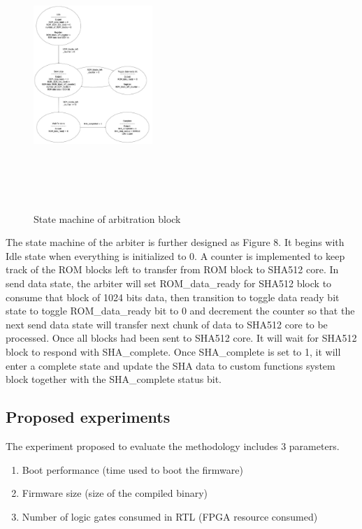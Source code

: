 \documentclass[a4paper,fleqn]{cas-dc}
\begin{document}
\begin{figure}[hbt!]
	\centering
	\includegraphics[width=0.4\textwidth,height=4in]{figs/StateMachine.JPG}
	\caption{State machine of arbitration block}
\end{figure}


The state machine of the arbiter is further designed as Figure 8. It begins with Idle state when everything is initialized to 0. A counter is implemented to keep track of the ROM blocks left to transfer from ROM block to SHA512 core. In send data state, the arbiter will set ROM\_data\_ready for SHA512 block to consume that block of 1024 bits data, then transition to toggle data ready bit state to toggle ROM\_data\_ready bit to 0 and decrement the counter so that the next send data state will transfer next chunk of data to SHA512 core to be processed. Once all blocks had been sent to SHA512 core. It will wait for SHA512 block to respond with SHA\_complete. Once SHA\_complete is set to 1, it will enter a complete state and update the SHA data to custom functions system block together with the SHA\_complete status bit.

\subsection{ Proposed experiments}
The experiment proposed to evaluate the methodology includes 3 parameters.
\begin{enumerate}
\itemsep=-1pt 		%
\itemindent=0pt 	%
\item 
Boot performance (time used to boot the firmware)
\item 
Firmware size (size of the compiled binary)
\item 
Number of logic gates consumed in RTL (FPGA resource consumed)
\end{enumerate}
\end{document}

